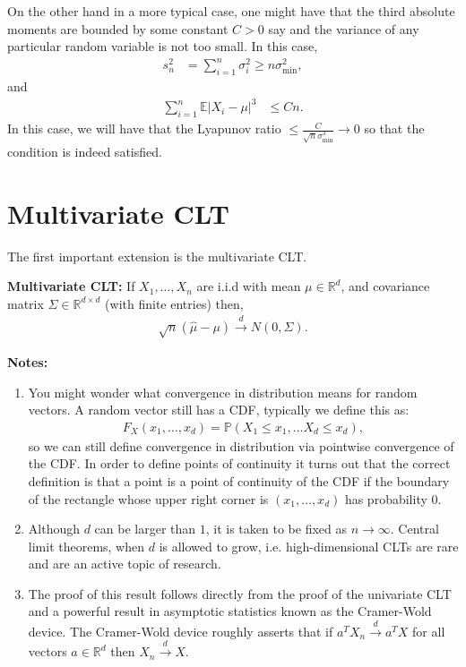 \documentclass[twoside,12pt]{article}
\newcommand{\cdist}{\overset{d}{\rightarrow}}
\begin{document}
On the other hand in a more typical case, one might have that the third absolute moments are bounded by some constant $C > 0$ say and the variance of any particular random variable is not too small. In this case,
\begin{align*}
s_n^2 &= \sum_{i=1}^n \sigma_i^2 \geq n \sigma_{\min}^2, 
\end{align*}
and
\begin{align*}
\sum_{i=1}^n \mathbb{E} |X_i - \mu|^3 & \leq Cn. 
\end{align*}
In this case, we will have that the Lyapunov ratio $\leq \frac{C}{\sqrt{n} \sigma_{\min}^3} \rightarrow 0$ so that the condition is indeed satisfied. 



\section{Multivariate CLT}
The first important extension is the multivariate CLT.

{\bf Multivariate CLT: } If $X_1,\ldots,X_n$ are i.i.d with mean $\mu \in \mathbb{R}^d$, and covariance matrix $\Sigma \in \mathbb{R}^{d \times d}$ (with finite entries) then,
\begin{align*}
\sqrt{n} (\widehat{\mu} - \mu) \cdist N(0,\Sigma).
\end{align*}

{\bf Notes: } 
\begin{enumerate}
\item You might wonder what convergence in distribution means for random vectors. A random vector still has a CDF, typically we define this as:
\begin{align*}
F_X(x_1,\ldots,x_d) = \mathbb{P}(X_1 \leq x_1, \ldots X_d \leq x_d),
\end{align*}
so we can still define convergence in distribution via pointwise convergence of the CDF. In order to define points of continuity it turns out that the correct definition is that a point is a point of continuity of the CDF if the boundary of the rectangle whose upper right corner is $(x_1,\ldots,x_d)$ has probability $0$. 
\item Although $d$ can be larger than $1$, it is taken to be fixed as $n \rightarrow \infty$. Central limit theorems, when $d$ is allowed to grow, i.e. high-dimensional CLTs are rare and are an active topic of research.
\item The proof of this result follows directly from the proof of the univariate CLT and a powerful result in asymptotic statistics known as the Cramer-Wold device. The Cramer-Wold device roughly asserts that if $a^T X_n \cdist a^T X$ for all vectors $a \in \mathbb{R}^d$ then $X_n \cdist X.$  
\end{enumerate}
\end{document}
